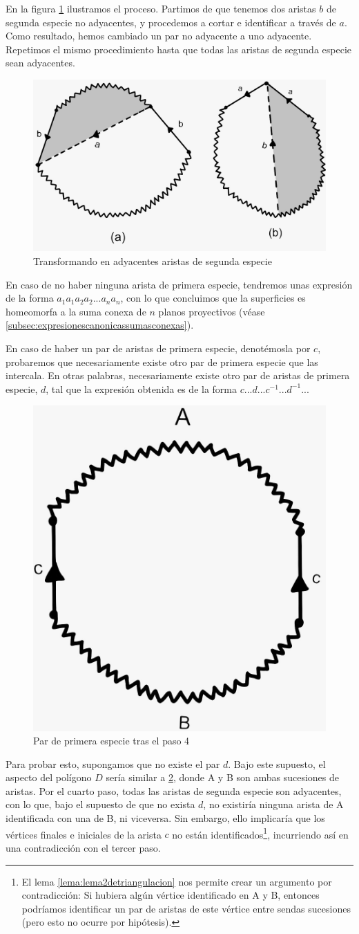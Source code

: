 \documentclass[a4paper,11pt,spanish, twoside, leqno]{tfg-uam}
\theoremstyle{definition}
\begin{document}
En la figura \ref{fig:paso4} ilustramos el proceso. Partimos de que tenemos dos aristas $b$ de segunda especie no adyacentes, y procedemos a cortar e identificar a través de $a$. Como resultado, hemos cambiado un par no adyacente a uno adyacente. Repetimos el mismo procedimiento hasta que todas las aristas de segunda especie sean adyacentes.

\begin{figure}[h!]
	\centering
	\includegraphics[width=0.4\linewidth]{imagenes/paso4.jpeg}
	\caption{Transformando en adyacentes aristas de segunda especie}
	\label{fig:paso4}
\end{figure}

En caso de no haber ninguna arista de primera especie, tendremos unas expresión de la forma $a_1a_1a_2a_2...a_na_n$, con lo que concluimos que la superficies es homeomorfa a la suma conexa de $n$ planos proyectivos (véase \ref{subsec:expresionescanonicassumasconexas}).

En caso de haber un par de  aristas de primera especie, denotémosla por $c$, probaremos que necesariamente existe otro par de primera especie que las intercala. En otras palabras, necesariamente existe otro par de aristas de primera especie, $d$, tal que la expresión obtenida es de la forma $c...d...c^{-1}...d^{-1}...$

\begin{figure}[h!]
	\centering
	\includegraphics[width=0.2\linewidth]{imagenes/paso4_2.jpeg}
	\caption{Par de primera especie tras el paso 4}
	\label{fig:paso4_2}
\end{figure}

Para probar esto, supongamos que no existe el par $d$. Bajo este supuesto, el aspecto del polígono $D$ sería similar a \ref{fig:paso4_2}, donde A y B son ambas sucesiones de aristas. Por el cuarto paso, todas las aristas de segunda especie son adyacentes, con lo que, bajo el supuesto de que no exista $d$, no existiría ninguna arista de A identificada con una de B, ni viceversa. Sin embargo, ello implicaría que los vértices finales e iniciales de la arista $c$ no están identificados\footnote{El lema \ref{lema:lema2detriangulacion} nos permite crear un argumento por contradicción: Si hubiera algún vértice identificado en A y B, entonces podríamos identificar un par de aristas de este vértice entre sendas sucesiones (pero esto no ocurre por hipótesis).},  incurriendo así en una contradicción con el tercer paso.
\end{document}
